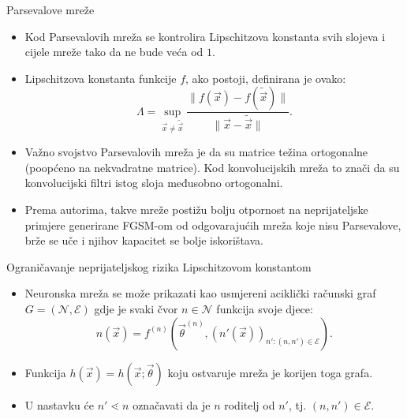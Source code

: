 \documentclass{beamer}
\begin{document}
\begin{frame}{Parsevalove mreže}
\begin{itemize}
	\item Kod Parsevalovih mreža se kontrolira Lipschitzova konstanta svih slojeva i cijele mreže tako da ne bude veća od $1$.
	\item Lipschitzova konstanta funkcije $f$, ako postoji, definirana je ovako:
	\begin{equation}
	\Lambda = \sup_{\vec x\neq \widetilde{\vec x}} \frac{\lVert f(\vec x)-f(\widetilde{\vec x})\rVert}{\lVert \vec x-\widetilde{\vec x}\rVert}.
	\end{equation}
	
	\item Važno svojstvo Parsevalovih mreža je da su matrice težina ortogonalne (poopćeno na nekvadratne matrice). Kod konvolucijskih mreža to znači da su konvolucijski filtri istog sloja međusobno ortogonalni.
	\item Prema autorima, takve mreže postižu bolju otpornost na neprijateljske primjere generirane FGSM-om od odgovarajućih mreža koje nisu Parsevalove, brže se uče i njihov kapacitet se bolje iskorištava.
\end{itemize}
\end{frame}

\begin{frame}{Ograničavanje neprijateljskog rizika Lipschitzovom konstantom}
\begin{itemize}
	\item Neuronska mreža se može prikazati kao usmjereni aciklički računski graf $G = (\mathcal{N}, \mathcal{E})$ gdje je svaki čvor $n\in\mathcal{N}$ funkcija svoje djece:
	\begin{equation}
	n(\vec x)=f^{(n)}(\vec\theta^{(n)}, (n'(\vec x))_{n':(n,n')\in\mathcal{E}}).
	\end{equation}
	\item Funkcija $h(\vec x) = h(\vec x;\vec\theta)$ koju ostvaruje mreža je korijen toga grafa. 
	\item U nastavku će $n'\lessdot n$ označavati da je $n$ roditelj od $n'$, tj. $(n,n')\in\mathcal{E}$.
\end{itemize}
\end{frame}
\end{document}
